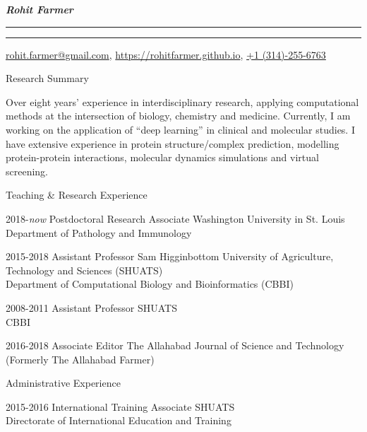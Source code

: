 \documentclass[10pt]{article}
\begin{document}
\settowidth{\cvlabelwidth}{%
\cvlabelfont 2009-2009%
}%
\begin{cv}{\huge \it \bfseries Rohit Farmer}
\vskip3pt
\hrule\hrule
\vskip3pt
\hfill \url{rohit.farmer@gmail.com},  \url{https://rohitfarmer.github.io}, \url{+1 (314)-255-6763}

{
\setlength{\cvlabelsep}{0mm}
\setlength{\cvlabelwidth}{0mm}
\begin{cvlist}{Research Summary}
	\item Over   eight   years’   experience   in   interdisciplinary   research,   applying   computational   methods   at   the intersection of biology, chemistry  and medicine. Currently, I  am  working  on the application of  “deep learning”   in   clinical   and   molecular   studies.   I   have   extensive   experience   in   protein   structure/complex prediction, modelling protein-protein interactions, molecular dynamics simulations and virtual screening.
\end{cvlist}
}

\begin{cvlist}{Teaching \& Research Experience}
	\item[2018-\emph{now}] Postdoctoral Research Associate \hfill Washington University in St. Louis\\  \hspace*{\fill} Department of Pathology and Immunology
	\item[2015-2018] Assistant Professor \hfill Sam Higginbottom University of Agriculture, Technology and Sciences (SHUATS)\\  \hspace*{\fill} Department of Computational Biology and Bioinformatics (CBBI)
	\item[2008-2011] Assistant Professor \hfill SHUATS\\  \hspace*{\fill} CBBI
	\item[2016-2018] Associate Editor \hfill The Allahabad Journal of Science and Technology \\  \hspace*{\fill} (Formerly The Allahabad Farmer)
\end{cvlist}

\begin{cvlist}{Administrative Experience}
	\item[2015-2016] International Training Associate \hfill SHUATS \\  \hspace*{\fill} Directorate of International Education and Training
\end{cvlist}


\end{cv}
\end{document}
